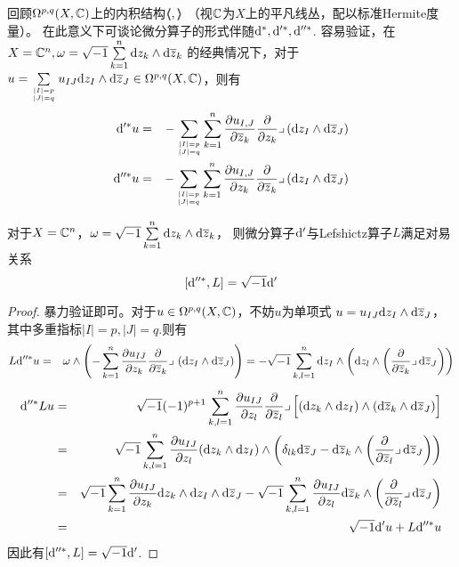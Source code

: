 回顾$\Omega^{p,q}(X,\mathbb{C})$上的内积结构$\langle\!\! \langle , \rangle\!\! \rangle$
（视$\mathbb{C}$为$X$上的平凡线丛，配以标准Hermite度量）。
在此意义下可谈论微分算子的形式伴随$\mathrm{d}^*,\mathrm{d}'^*,\mathrm{d}''^*$.
容易验证，在$X=\mathbb{C}^n,\omega=\sqrt{-1}\sum\limits_{k=1}^n\mathrm{d} z_k\wedge\mathrm{d}\overline{z}_k$
的经典情况下，对于$u=\sum\limits_{|I|=p\atop|J|=q}u_{IJ}
\mathrm{d} z_I\wedge\mathrm{d}\overline{z}_J\in\Omega^{p,q}(X,\mathbb{C})$，则有
\begin{eqnarray*}
  \mathrm{d}'^*u
&=&
  -\sum_{|I|=p\atop |J|=q}
    \sum_{k=1}^n
    \frac{\partial u_{I,J}} {\partial \overline{z}_k}
    \frac{\partial } {\partial z_k}
    \lrcorner\,
    (\mathrm{d} z_I\wedge\mathrm{d}\overline{z}_J)
\\
  \mathrm{d}''^*u
&=&
  -\sum_{|I|=p\atop |J|=q}
    \sum_{k=1}^n
      \frac{\partial u_{I,J}} {\partial z_k}
      \frac{\partial } {\partial \overline{z}_k}
      \lrcorner\,
      (\mathrm{d} z_I\wedge\mathrm{d}\overline{z}_J)
\end{eqnarray*}


\begin{lemma}
\label{Kahler对易关系-基本引理-lem}
对于$X=\mathbb{C}^n$，$\omega=\sqrt{-1}\sum\limits_{k=1}^n\mathrm{d} z_k\wedge\mathrm{d}\overline{z}_k$，
则微分算子$\mathrm{d}'$与Lefshictz算子$L$满足对易关系
$$[\mathrm{d}''^*,L]=\sqrt{-1}\mathrm{d}'$$
\end{lemma}

\begin{proof}
暴力验证即可。对于$u\in\Omega^{p,q}(X,\mathbb{C})$，不妨$u$为单项式
$u=u_{IJ}\mathrm{d} z_I\wedge\mathrm{d}\overline{z}_J$，其中多重指标$|I|=p,|J|=q$.则有
\begin{eqnarray*}
     L\mathrm{d}''^*u
&=&
     \omega\wedge
     \left(
       -\sum_{k=1}^{n}
         \frac{\partial u_{IJ}} {\partial z_k}
         \frac{\partial } {\partial \overline{z}_k}\lrcorner\,
         \left(
           \mathrm{d} z_I\wedge\mathrm{d}\overline{z}_J
         \right)
     \right)
=
     -\sqrt{-1}
     \sum_{k,l=1}^{n}
     \mathrm{d} z_I\wedge
     \left(
       \mathrm{d} z_l\wedge
       \left(
         \frac{\partial } {\partial \overline{z}_k}\lrcorner\,\mathrm{d}\overline{z}_J
       \right)
     \right)
\end{eqnarray*}
\begin{eqnarray*}
     \mathrm{d}''^*Lu
&=&
     \sqrt{-1}(-1)^{p+1}
     \sum_{k,l=1}^{n}
       \frac{\partial u_{IJ}} {\partial z_l}
       \frac{\partial } {\partial \overline{z}_l}\lrcorner\,
       \Big[
         (\mathrm{d} z_k\wedge\mathrm{d} z_I)\wedge
         (\mathrm{d}\overline{z}_k\wedge\mathrm{d}\overline{z}_J)
       \Big]\\
&=&
     \sqrt{-1}
     \sum_{k,l=1}^{n}
       \frac{\partial u_{IJ}} {\partial z_l}
         (\mathrm{d} z_k\wedge\mathrm{d} z_I)\wedge
         \left(
           \delta_{lk}\mathrm{d}\overline{z}_J-\mathrm{d}\overline{z}_k\wedge
           \left(
             \frac{\partial } {\partial \overline{z}_l}\lrcorner\,\mathrm{d}\overline{z}_J
           \right)
         \right)\\
&=&
     \sqrt{-1}\sum_{k=1}^{n}
     \frac{\partial u_{IJ}} {\partial z_k}
     \mathrm{d} z_k\wedge\mathrm{d} z_I\wedge\mathrm{d}\overline{z}_J
    -\sqrt{-1}\sum_{k,l=1}^{n}
       \frac{\partial u_{IJ}} {\partial z_l}
       \mathrm{d}\overline{z}_k\wedge
       \left(
         \frac{\partial } {\partial \overline{z}_l}\lrcorner\,\mathrm{d}\overline{z}_J
       \right)\\
&=&
     \sqrt{-1}\mathrm{d}' u+L\mathrm{d}''^*u
\end{eqnarray*}
因此有$[\mathrm{d}''^*,L]=\sqrt{-1}\mathrm{d}'$.
\end{proof}

